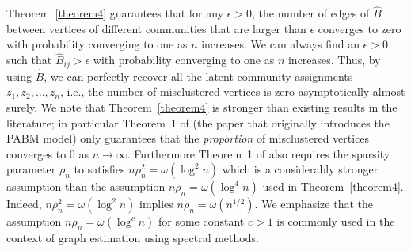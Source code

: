 \documentclass[12pt]{article}
\begin{document}
Theorem~\ref{theorem4} guarantees that for any $\epsilon > 0$, 
the number of edges of $\hat{B}$ between vertices of different communities 
that are larger than $\epsilon$ converges to zero with probability
converging to one as $n$ increases. 
We can always find an $\epsilon > 0$ such that $\hat{B}_{ij} > \epsilon$ 
with probability converging to one as $n$ increases. 
Thus, by using $\hat{B}$, we can 
perfectly recover all the latent community assignments $z_1, z_2,
\dots, z_n$, i.e., the number of misclustered vertices is zero
asymptotically almost surely. We note that Theorem~\ref{theorem4} is
stronger than existing results in the literature; in particular
Theorem~1 of \citet{307cbeb9b1be48299388437423d94bf1} (the paper that
originally introduces the PABM model) only guarantees that the {\em proportion} of misclustered vertices converges to $0$ as $n
\rightarrow \infty$. Furthermore Theorem~1
of \citet{307cbeb9b1be48299388437423d94bf1} also requires the sparsity
parameter $\rho_n$ to satisfies $n \rho_n^2 = \omega(\log^2{n})$ which
is a considerably stronger assumption than the assumption $n \rho_n =
\omega(\log^{4}{n})$ used in Theorem~\ref{theorem4}. Indeed, $n
\rho_n^2 = \omega(\log^{2}{n})$ implies $n \rho_n = \omega(n^{1/2})$. 
We emphasize that the assumption $n \rho_n = \omega(\log^{c}{n})$ for
some constant $c > 1$ is commonly used in the context of graph
estimation using spectral methods.
\end{document}
